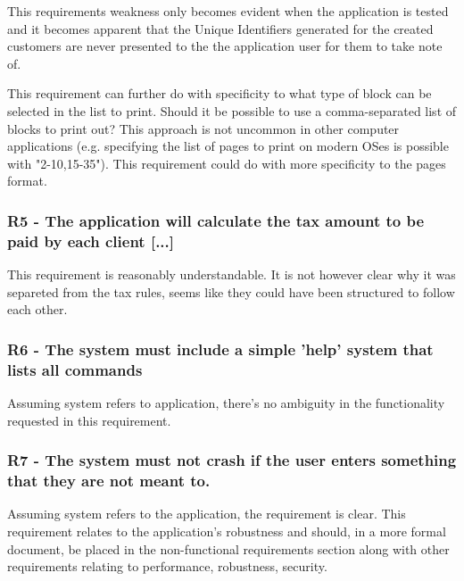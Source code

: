 This requirements weakness only becomes evident when the application is tested and it becomes apparent that the Unique Identifiers generated for the created customers are never presented to the the application user for them to take note of. 

This requirement can further do with specificity to what type of block can be selected in the list to print. 
Should it be possible to use a comma-separated list of blocks to print out? This approach is not uncommon in other computer applications (e.g. specifying the list of pages to print on modern OSes is possible with "2-10,15-35"). This requirement could do with more specificity to the pages format. 

\subsubsection{R5 - The application will calculate the tax amount to be paid by each client [...]} %

This requirement is reasonably understandable. It is not however clear why it was separeted from the tax rules, seems like they could have been structured to follow each other. 

\subsubsection{R6 - The system must include a simple 'help' system that lists all commands}
Assuming system refers to application, there's no ambiguity in the functionality requested in this requirement. 

\subsubsection{R7 - The system must not crash if the user enters something that they are not meant to.}
Assuming system refers to the application, the requirement is clear. This requirement relates to the application's robustness and should, in a more formal document, be placed in the non-functional requirements section along with other requirements relating to performance, robustness, security. 

